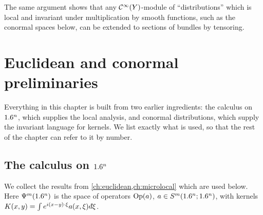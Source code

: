 The same argument shows that any $\mathcal{C}^\infty(Y)$-module of ``distributions'' which is
local and invariant under multiplication by smooth functions, such as the
conormal spaces below, can be extended to sections of bundles by tensoring.

\section{Euclidean and conormal preliminaries}\label{manifolds:sec:recall}
Everything in this chapter is built from two earlier ingredients: the
calculus on $1.6^n$, which supplies the local analysis, and conormal
distributions, which supply the invariant language for kernels. We list
exactly what is used, so that the rest of the chapter can refer to it by
number.

\subsection{The calculus on $1.6^n$}
We collect the results from \cref{ch:euclidean,ch:microlocal} which are used
below. Here $\Psi^{m}(1.6^n)$ is the space of operators $\operatorname{Op}(a)$,
$a\in S^m(1.6^n;1.6^n)$, with kernels
$K(x,y)=\int e^{i(x-y)\cdot\xi}a(x,\xi)\,\dbar\xi$.
